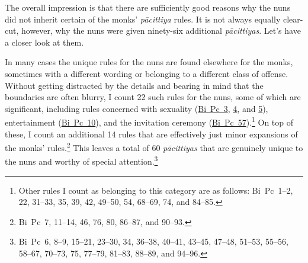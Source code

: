 \documentclass[12pt,openany]{book}%
\begin{document}
The overall impression is that there are sufficiently good reasons why the nuns did not inherit certain of the monks’ \textit{\textsanskrit{pācittiya}} rules. It is not always equally clear-cut, however, why the nuns were given ninety-six additional \textit{\textsanskrit{pācittiyas}}. Let’s have a closer look at them.

In many cases the unique rules for the nuns are found elsewhere for the monks, sometimes with a different wording or belonging to a different class of offense. Without getting distracted by the details and bearing in mind that the boundaries are often blurry, I count 22 such rules for the nuns, some of which are significant, including rules concerned with sexuality (\href{https://suttacentral.net/pli-tv-bi-vb-pc3/en/brahmali\#1.14.1}{Bi~Pc~3}, \href{https://suttacentral.net/pli-tv-bi-vb-pc4/en/brahmali\#1.21.1}{4}, and \href{https://suttacentral.net/pli-tv-bi-vb-pc5/en/brahmali\#1.2.12.1}{5}), entertainment (\href{https://suttacentral.net/pli-tv-bi-vb-pc10/en/brahmali\#1.15.1}{Bi~Pc~10}), and the invitation ceremony (\href{https://suttacentral.net/pli-tv-bi-vb-pc57/en/brahmali\#1.15.1}{Bi~Pc~57}).\footnote{Other rules I count as belonging to this category are as follows: Bi Pc 1–2, 22, 31–33, 35, 39, 42, 49–50, 54, 68–69, 74, and 84–85. } On top of these, I count an additional 14 rules that are effectively just minor expansions of the monks’ rules.\footnote{Bi Pc 7, 11–14, 46, 76, 80, 86–87, and 90–93. } This leaves a total of 60 \textit{\textsanskrit{pācittiyas}} that are genuinely unique to the nuns and worthy of special attention.\footnote{Bi Pc 6, 8–9, 15–21, 23–30, 34, 36–38, 40–41, 43–45, 47–48, 51–53, 55–56, 58–67, 70–73, 75, 77–79, 81–83, 88–89, and 94–96. }
\end{document}

